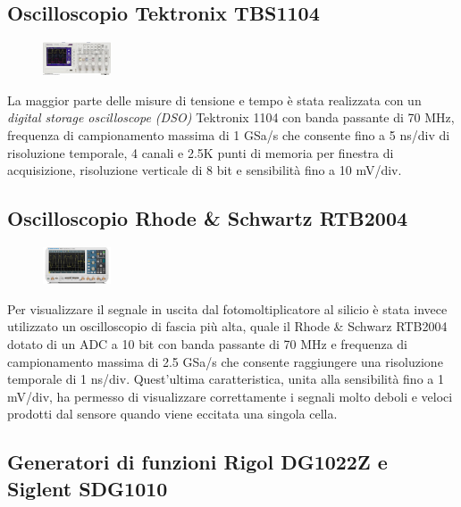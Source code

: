 \documentclass[journal]{IEEEtran}
\begin{document}
\subsection{\textbf{Oscilloscopio Tektronix TBS1104}}

\begin{figure}[h!]
  \centering
  \includegraphics[width=0.18\textwidth]{lab-reports/Schematics-and-graphics/TEK Osc.png}
\end{figure}

La maggior parte delle misure di tensione e tempo è stata realizzata con un \textit{digital storage oscilloscope (DSO)} Tektronix 1104 con banda passante di 70 MHz, frequenza di campionamento massima di 1 GSa/s che consente fino a 5 ns/div di risoluzione temporale, 4 canali e 2.5K punti di memoria per finestra di acquisizione, risoluzione verticale di 8 bit e sensibilità fino a 10 mV/div. \cite{A}

\subsection{\textbf{Oscilloscopio Rhode \& Schwartz RTB2004}}

\begin{figure}[h!]
  \centering
  \includegraphics[width=0.18\textwidth]{lab-reports/Schematics-and-graphics/RS Osc.png}
\end{figure}

Per visualizzare il segnale in uscita dal fotomoltiplicatore al silicio è stata invece utilizzato un oscilloscopio di fascia più alta, quale il Rhode & Schwarz RTB2004 dotato di un ADC a 10 bit con banda passante di 70 MHz e frequenza di campionamento massima di 2.5 GSa/s che consente raggiungere una risoluzione temporale di 1 ns/div. Quest'ultima caratteristica, unita alla sensibilità fino a 1 mV/div, ha permesso di visualizzare correttamente i segnali molto deboli e veloci prodotti dal sensore quando viene eccitata una singola cella. \cite{B}

\subsection{\textbf{Generatori di funzioni Rigol DG1022Z e Siglent SDG1010}}
\end{document}
